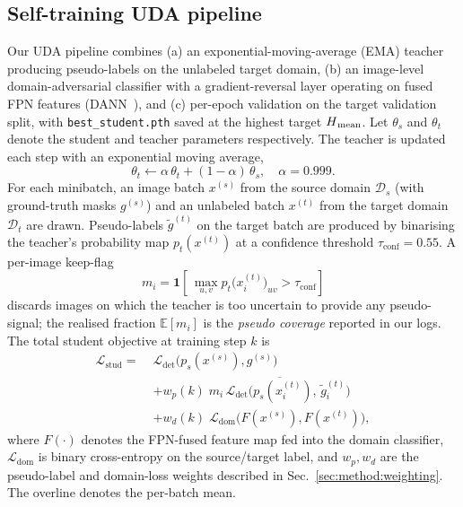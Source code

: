 \subsection{Self-training UDA pipeline}
\label{sec:method:uda}
Our UDA pipeline combines (a) an exponential-moving-average (EMA)
teacher producing pseudo-labels on the unlabeled target domain, (b) an
image-level domain-adversarial classifier with a gradient-reversal layer
operating on fused FPN features (DANN~\cite{ganin2015dann}), and
(c) per-epoch validation on the target validation split, with
\texttt{best\_student.pth} saved at the highest target $H\textsubscript{mean}$.
Let $\theta_s$ and $\theta_t$ denote the student and teacher parameters
respectively. The teacher is updated each step with an exponential moving
average,
\begin{equation}
  \theta_t \leftarrow \alpha\,\theta_t + (1-\alpha)\,\theta_s,
  \quad \alpha = 0.999.
  \label{eq:ema}
\end{equation}
For each minibatch, an image batch $x^{(s)}$ from the source domain
$\mathcal{D}_s$ (with ground-truth masks $g^{(s)}$) and an unlabeled
batch $x^{(t)}$ from the target domain $\mathcal{D}_t$ are drawn.
Pseudo-labels $\tilde g^{(t)}$ on the target batch are produced by
binarising the teacher's probability map $p_t(x^{(t)})$ at a confidence
threshold $\tau_{\mathrm{conf}}=0.55$. A per-image keep-flag
\begin{equation}
  m_i =
  \mathbf{1}\!\left[\,
    \max_{u,v} p_t\bigl(x_i^{(t)}\bigr)_{uv} > \tau_{\mathrm{conf}}
  \right]
  \label{eq:keep}
\end{equation}
discards images on which the teacher is too uncertain to provide any
pseudo-signal; the realised fraction $\mathbb{E}[m_i]$ is the
\emph{pseudo coverage} reported in our logs. The total student
objective at training step $k$ is
\begin{equation}
\begin{aligned}
  \mathcal{L}_{\mathrm{stud}}
   = \;& \mathcal{L}_{\mathrm{det}}\!\bigl(p_s(x^{(s)}), g^{(s)}\bigr) \\
     & + w_p(k)\;\overline{m_i\,
        \mathcal{L}_{\mathrm{det}}\!\bigl(p_s(x_i^{(t)}),\,\tilde g_i^{(t)}\bigr)} \\
     & + w_d(k)\;\mathcal{L}_{\mathrm{dom}}\!\bigl(F(x^{(s)}),F(x^{(t)})\bigr),
\end{aligned}
  \label{eq:total}
\end{equation}
where $F(\cdot)$ denotes the FPN-fused feature map fed into the domain
classifier, $\mathcal{L}_{\mathrm{dom}}$ is binary cross-entropy on the
source/target label, and $w_p, w_d$ are the pseudo-label and
domain-loss weights described in Sec.~\ref{sec:method:weighting}. The
overline denotes the per-batch mean.

